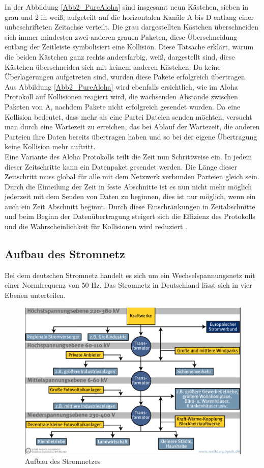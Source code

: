 In der Abbildung \ref{Abb2_PureAloha} sind insgesamt neun Kästchen, sieben in grau und 2 in weiß, aufgeteilt auf die horizontalen Kanäle A bis D entlang einer unbeschrifteten Zeitachse verteilt. Die grau dargestellten Kästchen überschneiden sich immer mindesten zwei anderen grauen Paketen, diese Überschneidung entlang der Zeitleiste symbolisiert eine Kollision. Diese Tatsache erklärt, warum die beiden Kästchen ganz rechts andersfarbig, weiß, dargestellt sind, diese Kästchen überschneiden sich mit keinem anderen Kästchen. Da keine Überlagerungen aufgetreten sind, wurden diese Pakete erfolgreich übertragen. Aus Abbildung \ref{Abb2_PureAloha} wird ebenfalls ersichtlich, wie im Aloha Protokoll auf Kollisionen reagiert wird, die wachsenden Abstände zwischen Paketen von A, nachdem Pakete nicht erfolgreich gesendet wurden. Da eine Kollision bedeutet, dass mehr als eine Partei Dateien senden möchten, versucht man durch eine Wartezeit zu erreichen, das bei Ablauf der Wartezeit, die anderen Parteien ihre Daten bereits übertragen haben und so bei der eigene Übertragung keine Kollision mehr auftritt.\\
Eine Variante des Aloha Protokolls teilt die Zeit nun Schrittweise ein. In jedem dieser Zeitschritte kann ein Datenpaket gesendet werden. Die Länge dieser Zeitschritt muss global für alle mit dem Netzwerk verbunden Parteien gleich sein. Durch die Einteilung der Zeit in feste Abschnitte ist es nun nicht mehr möglich jederzeit mit dem Senden von Daten zu beginnen, dies ist nur möglich, wenn ein auch ein Zeit Abschnitt beginnt. Durch diese Einschränkungen in Zeitabschnitte und beim Beginn der Datenübertragung steigert sich die Effizienz des Protokolls und die Wahrscheinlichkeit für Kollisionen wird reduziert \cite{Back_AlohaPure}.

\subsection{Aufbau des Stromnetz}
Bei dem deutschen Stromnetz handelt es sich um ein Wechselspannungsnetz mit einer Normfrequenz von 50 Hz. Das Stromnetz in Deutschland lässt sich in vier Ebenen unterteilen.
\begin{figure}[h!]
	\includegraphics[width=\linewidth]{img/Stromnetz1.png}
	\caption{Aufbau des Stromnetzes}
	\label{Abb1_Stromnetz}
\end{figure}


